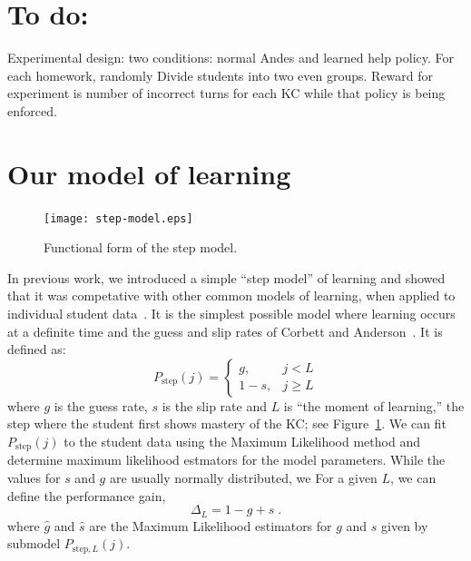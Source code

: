 \documentclass{edm_template}
\begin{document}

\section*{To do:}

Experimental design:  two conditions: normal Andes and learned
help policy.  For each homework, randomly Divide students into two 
even groups.  Reward for experiment is number of incorrect turns
for each KC while that policy is being enforced.



\section{Our model of learning}

\begin{figure}
\centering    \texttt{[image: step-model.eps]}
  \caption{Functional form of the step model.}
         \label{stepf}
\end{figure}

In previous work, we introduced a simple ``step model'' of learning
and showed that it was competative with other common models
of learning, when applied to individual student 
data~\cite{van_de_sande_applying_2013}.
It is the simplest possible model where learning occurs at
a definite time and the guess and slip rates of Corbett and 
Anderson~\cite{corbett_knowledge_1995}.  It is defined as:
%
\begin{equation}
               P_\mathrm{step}(j) = \left\{\begin{array}{cc}
                                       g,& j<L\\
				       1-s,& j\ge L
                                    \end{array}\right. \label{step}
\end{equation}
%
where $g$ is the guess rate, $s$ is the slip rate and 
$L$ is ``the moment of learning,'' the step where the student
first shows mastery of the KC; see Figure~\ref{stepf}.
%
We can fit $P_\mathrm{step}(j)$ to the student data using the
Maximum Likelihood method and determine maximum likelihood estmators
for the model parameters.  While the values for $s$ and $g$ are 
usually normally distributed, we 
For a given $L$, we can define the performance gain,
%
\begin{equation}
         \Delta_L = 1- g+s\; .
\end{equation}
%
where $\hat{g}$ and $\hat{s}$ are the
Maximum Likelihood estimators for $g$ and $s$ given by submodel
$P_{\mathrm{step},L}(j)$.
\end{document}
